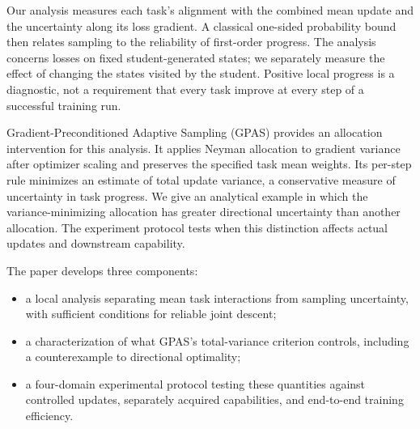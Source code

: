 Our analysis measures each task's alignment with the combined mean update
and the uncertainty along its loss gradient. A classical one-sided
probability bound then relates sampling to the reliability of first-order
progress. The analysis concerns losses on fixed student-generated states;
we separately measure the effect of changing the states visited by the
student. Positive local progress is a diagnostic, not a requirement that
every task improve at every step of a successful training run.

Gradient-Preconditioned Adaptive Sampling (GPAS) provides an allocation
intervention for this analysis. It applies Neyman allocation to gradient
variance after optimizer scaling and preserves the specified task mean
weights. Its per-step rule minimizes an estimate of total update variance,
a conservative measure of uncertainty in task progress. We give an
analytical example in which the
variance-minimizing allocation has greater directional uncertainty than
another allocation. The experiment protocol tests when this distinction
affects actual updates and downstream capability.

The paper develops three components:
\begin{itemize}
    \item a local analysis separating mean task interactions from sampling
    uncertainty, with sufficient conditions for reliable joint descent;
    \item a characterization of what GPAS's total-variance criterion controls,
    including a counterexample to directional optimality;
    \item a four-domain experimental protocol testing these quantities
    against controlled updates, separately acquired capabilities, and
    end-to-end training efficiency.
\end{itemize}
